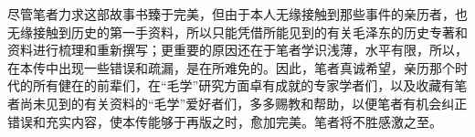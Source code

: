 \documentclass[../../dazhuan.tex]{subfiles}
\begin{document}
尽管笔者力求这部故事书臻于完美，但由于本人无缘接触到那些事件的亲历者，也无缘接触到历史的第一手资料，所以只能凭借所能见到的有关毛泽东的历史专著和资料进行梳理和重新撰写；更重要的原因还在于笔者学识浅薄，水平有限，所以，在本传中出现一些错误和疏漏，是在所难免的。因此，笔者真诚希望，亲历那个时代的所有健在的前辈们，在“毛学”研究方面卓有成就的专家学者们，以及收藏有笔者尚未见到的有关资料的“毛学”爱好者们，多多赐教和帮助，以便笔者有机会纠正错误和充实内容，使本传能够于再版之时，愈加完美。笔者将不胜感激之至。

\mbox{}\par
{}
    
\end{document}
